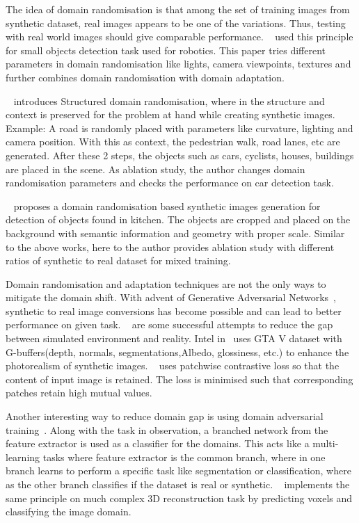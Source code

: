 The idea of domain randomisation is that among the set of training images from synthetic dataset, real images appears to be one of the variations.
Thus, testing with real world images should give comparable performance.
~\cite{tobin2017domain} used this principle for small objects detection task used for robotics.
This paper tries different parameters in domain randomisation like lights, camera viewpoints, textures and further combines domain randomisation with domain adaptation.

~\cite{prakash2020structured} introduces Structured domain randomisation, where in the structure and context is preserved for the problem at hand while creating synthetic images.
Example: A road is randomly placed with parameters like curvature, lighting and camera position.
With this as context, the pedestrian walk, road lanes, etc are generated.
After these 2 steps, the objects such as cars, cyclists, houses, buildings are placed in the scene.
As ablation study, the author changes domain randomisation parameters and checks the performance on car detection task.

~\cite{georgakis2017synthesizing} proposes a domain randomisation based synthetic images generation for detection of objects found in kitchen.
The objects are cropped and placed on the background with semantic information and geometry with proper scale.
Similar to the above works, here to the author provides ablation study with different ratios of synthetic to real dataset for mixed training.

Domain randomisation and adaptation techniques are not the only ways to mitigate the domain shift.
With advent of Generative Adversarial Networks~\cite{Goodfellow2014GenerativeAN}, synthetic to real image conversions has become possible and can lead to better performance on given task.
~\cite{Richter_2021, CycleGAN2017, park2020cut,isola2017image, dundar2018domain,Wang2018HighResolutionIS} are some successful attempts to reduce the gap between simulated environment and reality.
Intel in~\cite{Richter_2021} uses GTA V dataset with G-buffers(depth, normals, segmentations,Albedo, glossiness, etc.) to enhance the photorealism of synthetic images.
~\cite{park2020cut} uses patchwise contrastive loss so that the content of input image is retained.
The loss is minimised such that corresponding patches retain high mutual values.

Another interesting way to reduce domain gap is using domain adversarial training~\cite{ganin2016domainadversarial}.
Along with the task in observation, a branched network from the feature extractor is used as a classifier for the domains.
This acts like a multi-learning tasks where feature extractor is the common branch, where in one branch learns to perform a specific task like segmentation or classification, where as the other branch classifies if the dataset is real or synthetic.
~\cite{pinheiro2019domainadaptive} implements the same principle on much complex 3D reconstruction task by predicting voxels and classifying the image domain.


